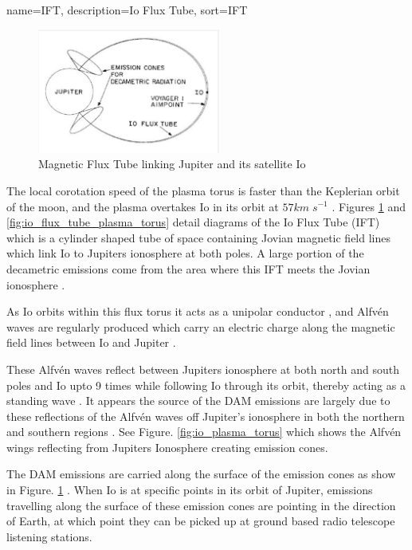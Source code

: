 \documentclass[runningheads,a4paper]{llncs}
\begin{document}
%
{
  name={IFT},
  description={Io Flux Tube},
  sort=IFT
}
%

%
\begin{figure}[here]
\centering
\includegraphics[width=6cm]{images/03}
\caption{Magnetic Flux Tube linking Jupiter and its satellite Io \citep{belcher87}}
\label{fig:io_flux_tube}
\end{figure}
%

The local corotation speed of the plasma torus is faster than the Keplerian orbit of the moon, and the plasma overtakes Io in its orbit at \begin{math} 57 km\;s^{-1} \end{math} \citep{belcher87}. Figures \ref{fig:io_flux_tube} and \ref{fig:io_flux_tube_plasma_torus} detail diagrams of the Io Flux Tube (\gls{IFT}) which is a cylinder shaped tube of space containing Jovian magnetic field lines \citep{belcher87} which link Io to Jupiters ionosphere at both poles. A large portion of the decametric emissions come from the area where this \gls{IFT} meets the Jovian ionosphere \citep{belcher87}. 

As Io orbits within this flux torus it acts as a unipolar conductor \citep{bose08}, and Alfv\'en waves are regularly produced which carry an electric charge along the magnetic field lines between Io and Jupiter \citep{bose08}.

 These Alfv\'en waves reflect between Jupiters ionosphere at both north and south poles and Io upto 9 times \citep{bose08} while following Io through its orbit, thereby acting as a standing wave \citep{bose08}. It appears the source of the \gls{DAM} emissions are largely due to these reflections of the Alfv\'en waves off Jupiter's ionosphere in both the northern and southern regions \citep{bose08}. See Figure. \ref{fig:io_plasma_torus} which shows the Alfv\'en wings reflecting from Jupiters Ionosphere creating emission cones. 

The \gls{DAM} emissions are carried along the surface of the emission cones as show in Figure. \ref{fig:io_flux_tube} \citep{belcher87}. When Io is at specific points in its orbit of Jupiter, emissions travelling along the surface of these emission cones are pointing in the direction of Earth, at which point they can be picked up at ground based radio telescope listening stations.
\end{document}
